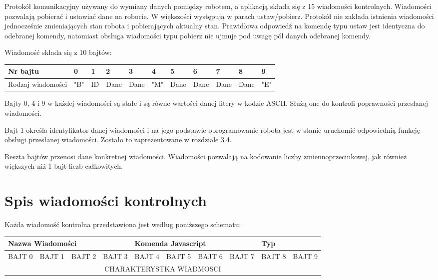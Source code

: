 \documentclass[eng,printmode]{mgr}
\begin{document}
Protokół komunikacyjny używany do wymiany danych pomiędzy robotem, a aplikacją składa się z 15 wiadomości kontrolnych. Wiadomości pozwalają  pobierać i ustawiać dane na robocie. W większości występują w parach ustaw/pobierz. Protokół nie zakłada istnienia wiadomości jednocześnie zmieniających stan robota i pobierających aktualny stan. Prawidłowa odpowiedź na komendę typu ustaw jest identyczna do odebranej komendy, natomiast obsługa wiadomości typu pobierz nie ujmuje pod uwagę pól danych odebranej komendy.

Wiadomość składa się z 10 bajtów:
\begin{table}[!htb]
\centering
\begin{adjustbox}{width=1\textwidth}
\label{my-label}
\begin{tabular}{|l|l|l|l|l|l|l|l|l|l|l|}
\hline
Nr bajtu          & 0   & 1  & 2    & 3    & 4   & 5    & 6    & 7    & 8    & 9   \\ \hline
Rodzaj wiadomości & "B" & ID & Dane & Dane & "M" & Dane & Dane & Dane & Dane & "E" \\ \hline
\end{tabular}
\end{adjustbox}
\end{table}

Bajty 0, 4 i 9 w każdej wiadomości  są stałe i są równe wartości danej litery w kodzie ASCII. Służą one do kontroli poprawności przesłanej wiadomości.

Bajt 1 określa identyfikator danej wiadomości i na jego podstawie oprogramowanie robota jest w stanie uruchomić odpowiednią funkcję obsługi przesłanej wiadomości. Zostało to zaprezentowane w rozdziale 3.4.

Reszta bajtów przenosi dane konkretnej wiadomości. Wiadomości pozwalają na kodowanie liczby zmiennoprzecinkowej, jak również większych niż 1 bajt liczb całkowitych.

 \section{Spis wiadomości kontrolnych}   

Każda wiadomość kontrolna przedstawiona jest według poniższego schematu:
\begin{table}[!htb]
\centering
\begin{adjustbox}{width=1\textwidth}
\label{my-label}
\begin{tabular}{|l|l|l|l|l|l|l|l|l|l|}
\hline
\multicolumn{4}{|l|}{Nazwa Wiadomości} & \multicolumn{4}{l|}{Komenda Javascript} & \multicolumn{2}{l|}{Typ} \\ \hline
BAJT 0      & BAJT 1      & BAJT 2     & BAJT 3      & BAJT 4      & BAJT 5      & BAJT 6      & BAJT 7     & BAJT 8     & BAJT 9     \\ \hline
\multicolumn{10}{|c|}{CHARAKTERYSTKA WIADMOSCI}                                                                                       \\ \hline
\end{tabular}
\end{adjustbox}
\end{table}
\end{document}
